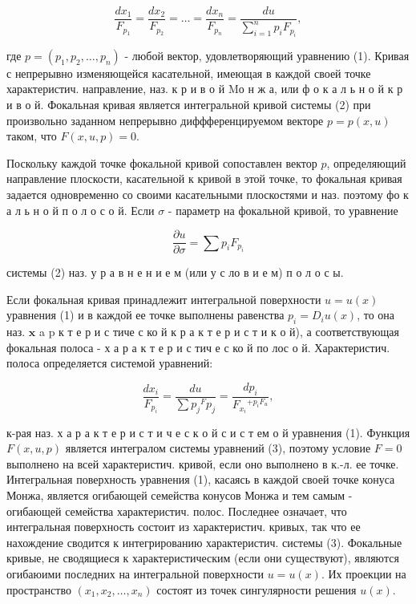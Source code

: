 \documentclass[10pt]{article}
\begin{document}
\[

\frac{d x_{1}}{F_{p_{1}}}=\frac{d x_{2}}{F_{p_{2}}}=\ldots=\frac{d x_{n}}{F_{p_{n}}}=\frac{d u}{\sum_{i=1}^{n} p_{i} F_{p_{i}}},

\]



где $p=\left(p_{1}, p_{2}, \ldots, p_{n}\right)$ - любой вектор, удовлетворяющий уравнению (1). Кривая с непрерывно изменяющейся касательной, имеющая в каждой своей точке характеристич. направление, наз. к р и в о й $\mathrm{M} о$ н ж а, или ф о к а л ь н о й к р и в о й. Фокальная кривая является интегральной кривой системы (2) при произвольно заданном непрерывно диффференцируемом векторе $p=p(x, u)$ таком, что $F(x, u, p)=0$.



Поскольку каждой точке фокальной кривой сопоставлен вектор $p$, определяющий направление плоскости, касательной к кривой в этой точке, то фокальная кривая задается одновременно со своими касательными плоскостями и наз. поэтому фо к а л ь н о й п о л о с о й. Если $\sigma$ - параметр на фокальной кривой, то уравнение



\[

\frac{\partial u}{\partial \sigma}=\sum p_{i} F_{p_{i}}

\]



системы (2) наз. у р а в н е н и е м (или у с ло в и е м) п о л о с ы.



Если фокальная кривая принадлежит интегральной поверхности $u=u(x)$ уравнения (1) и в каждой ее точке выполнены равенства $p_{i}=D_{i} u(x)$, то она наз. $\mathbf{x}$ a $\mathrm{p}$ к т е р и с тиче с ко й к р а к т е р и с т и к о й), а соответствующая фокальная полоса - х а р а к т е р и с тич е с ко й по лос о й. Характеристич. полоса определяется системой уравнений:



\[

\frac{d x_{i}}{F_{p_{i}}}=\frac{d u}{\sum p_{j}{ }^{F} p_{j}}=\frac{d p_{i}}{F_{x_{i}}{ }^{+p_{i} F_{u}}},

\]



к-рая наз. х а р а к т е р и с т и ч е с к о й с и с т ем о й уравнения (1). Функция $F(x, u, p)$ является интегралом системы уравнений (3), поэтому условие $F=0$ выполнено на всей характеристич. кривой, если оно выполнено в к.-л. ее точке. Интегральная поверхность уравнения (1), касаясь в каждой своей точке конуса Монжа, является огибающей семейства конусов Монжа и тем самым - огибающей семейства характеристич. полос. Последнее означает, что интегральная поверхность состоит из характеристич. кривых, так что ее нахождение сводится к интегрированию характеристич. системы (3). Фокальные кривые, не сводящиеся к характеристическим (если они существуют), являются огибаюими последних на интегральной поверхности $u=u(x)$. Их проекции на пространство $\left(x_{1}, x_{2}, \ldots, x_{n}\right)$ состоят из точек сингулярности решения $u(x)$.
\end{document}
